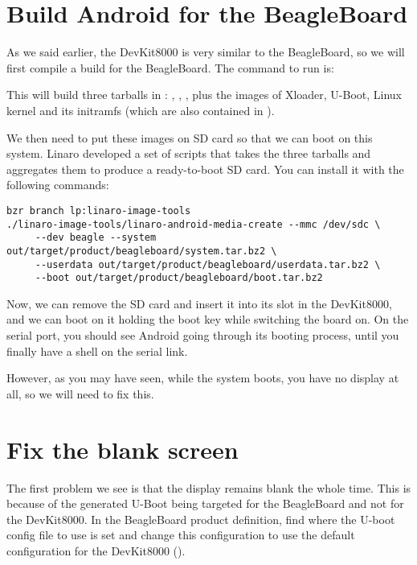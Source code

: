 \section{Build Android for the BeagleBoard}

As we said earlier, the DevKit8000 is very similar to the BeagleBoard, so we
will first compile a build for the BeagleBoard. The command to run is:


This will build three tarballs in :
, , , plus the images of Xloader,
U-Boot, Linux kernel and its initramfs (which are also contained in
).

We then need to put these images on SD card so that we can boot on this system.
Linaro developed a set of scripts that takes the three tarballs and aggregates
them to produce a ready-to-boot SD card. You can install it with the following
commands:

\begin{verbatim}
bzr branch lp:linaro-image-tools
./linaro-image-tools/linaro-android-media-create --mmc /dev/sdc \
     --dev beagle --system out/target/product/beagleboard/system.tar.bz2 \
     --userdata out/target/product/beagleboard/userdata.tar.bz2 \
     --boot out/target/product/beagleboard/boot.tar.bz2
\end{verbatim}

Now, we can remove the SD card and insert it into its slot in the DevKit8000,
and we can boot on it holding the boot key while switching the board on. On the
serial port, you should see Android going through its booting process, until
you finally have a shell on the serial link.

However, as you may have seen, while the system boots, you have no display at
all, so we will need to fix this.

\section{Fix the blank screen}

The first problem we see is that the display remains blank the whole time. This
is because of the generated U-Boot being targeted for the BeagleBoard and not
for the DevKit8000. In the BeagleBoard product definition, find where the U-boot
config file to use is set and change this configuration to use the default
configuration for the DevKit8000 (\code{devkit8000_config}).

